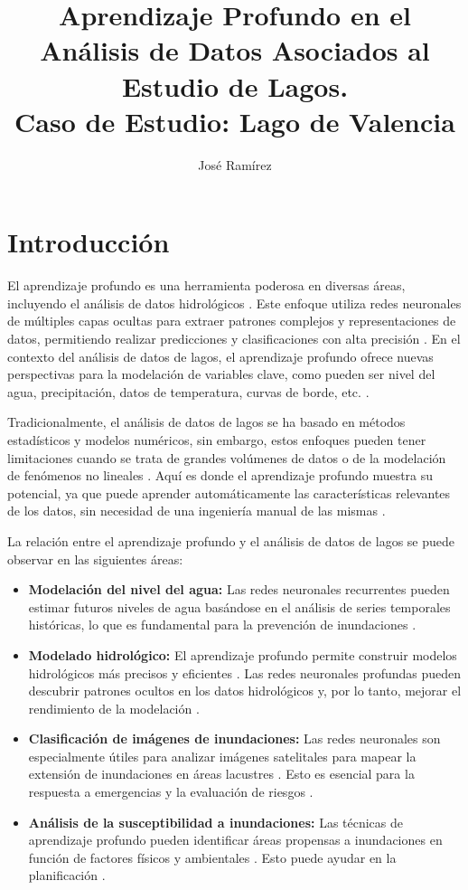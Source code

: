 \documentclass[12pt]{article}
\title{Aprendizaje Profundo en el Análisis de Datos Asociados al Estudio de Lagos. \\ Caso de Estudio: Lago de Valencia}
\author{José Ramírez}
\date{}
\begin{document}
\maketitle

\section{Introducción}
El aprendizaje profundo es una herramienta poderosa en diversas áreas, incluyendo el análisis de datos hidrológicos \autocite{ayus2023}. Este enfoque utiliza redes neuronales de múltiples capas ocultas para extraer patrones complejos y representaciones de datos, permitiendo realizar predicciones y clasificaciones con alta precisión \cite{bentivoglio2022}. En el contexto del análisis de datos de lagos, el aprendizaje profundo ofrece nuevas perspectivas para la modelación de variables clave, como pueden ser nivel del agua, precipitación, datos de temperatura, curvas de borde, etc. \cite{higham2019}.

Tradicionalmente, el análisis de datos de lagos se ha basado en métodos estadísticos y modelos numéricos, sin embargo, estos enfoques pueden tener limitaciones cuando se trata de grandes volúmenes de datos o de la modelación de fenómenos no lineales \cite{ayus2023,higham2019}. Aquí es donde el aprendizaje profundo muestra su potencial, ya que puede aprender automáticamente las características relevantes de los datos, sin necesidad de una ingeniería manual de las mismas \cite{bentivoglio2022}.

La relación entre el aprendizaje profundo y el análisis de datos de lagos se puede observar en las siguientes áreas:
\begin{itemize}[label=\textbullet]
    \item \textbf{Modelación del nivel del agua:} Las redes neuronales recurrentes pueden estimar futuros niveles de agua basándose en el análisis de series temporales históricas, lo que es fundamental para la prevención de inundaciones \cite{ayus2023}.
    \item \textbf{Modelado hidrológico:} El aprendizaje profundo permite construir modelos hidrológicos más precisos y eficientes \cite{bentivoglio2022}. Las redes neuronales profundas pueden descubrir patrones ocultos en los datos hidrológicos y, por lo tanto, mejorar el rendimiento de la modelación \cite{bentivoglio2022}.
    \item \textbf{Clasificación de imágenes de inundaciones:} Las redes neuronales son especialmente útiles para analizar imágenes satelitales para mapear la extensión de inundaciones en áreas lacustres \cite{bentivoglio2022}. Esto es esencial para la respuesta a emergencias y la evaluación de riesgos \cite{bentivoglio2022}.
    \item \textbf{Análisis de la susceptibilidad a inundaciones:} Las técnicas de aprendizaje profundo pueden identificar áreas propensas a inundaciones en función de factores físicos y ambientales \cite{bentivoglio2022}. Esto puede ayudar en la planificación \cite{bentivoglio2022}.
\end{itemize}
\end{document}
